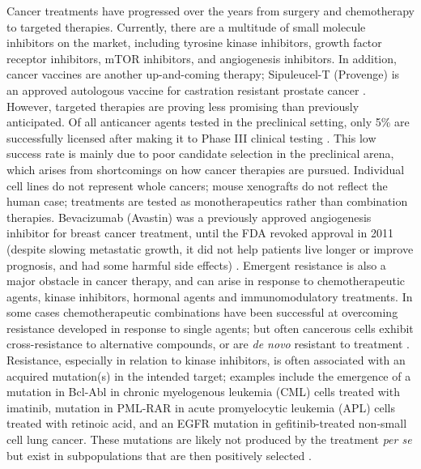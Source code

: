\documentclass[12pt]{article}
\begin{document}
Cancer treatments have progressed over the years from surgery and chemotherapy to targeted therapies. 
Currently, there are a multitude of small molecule inhibitors on the market, including tyrosine kinase inhibitors, growth factor receptor inhibitors, mTOR inhibitors, and angiogenesis inhibitors. In addition, cancer vaccines are another up-and-coming therapy; Sipuleucel-T (Provenge) is an approved autologous vaccine for castration resistant prostate cancer \cite{Vanneman2012}.
However, targeted therapies are proving less promising than previously anticipated. 
Of all anticancer agents tested in the preclinical setting, only 5\% are successfully licensed after making it to Phase III clinical testing \cite{Hutchinson2011}. 
This low success rate is mainly due to poor candidate selection in the preclinical arena, which arises from shortcomings on how cancer therapies are pursued. 
Individual cell lines do not represent whole cancers; mouse xenografts do not reflect the human case; treatments are tested as monotherapeutics rather than combination therapies. 
Bevacizumab (Avastin) was a previously approved angiogenesis inhibitor for breast cancer treatment, until the FDA revoked approval in 2011 (despite slowing metastatic growth, it did not help patients live longer or improve prognosis, and had some harmful side effects) \cite{Pollack2011}. 
Emergent resistance is also a major obstacle in cancer therapy, and can arise in response to chemotherapeutic agents, kinase inhibitors, hormonal agents and immunomodulatory treatments. 
In some cases chemotherapeutic combinations have been successful at overcoming resistance developed in response to single agents; but often cancerous cells exhibit cross-resistance to alternative compounds, or are \textit{de novo} resistant to treatment \cite{Garraway2012}. Resistance, especially in relation to kinase inhibitors, is often associated with an acquired mutation(s) in the intended target; examples include the emergence of a mutation in Bcl-Abl in chronic myelogenous leukemia (CML) cells treated with imatinib, mutation in PML-RAR in acute promyelocytic leukemia (APL) cells treated with retinoic acid, and an EGFR mutation in gefitinib-treated non-small cell lung cancer. 
These mutations are likely not produced by the treatment \textit{per se} but exist in subpopulations that are then positively selected \cite{Garraway2012}. 
\end{document}
